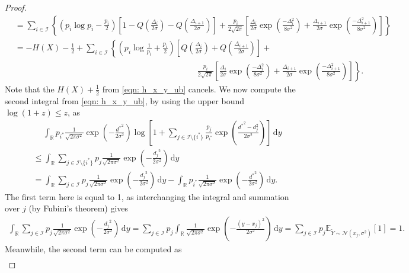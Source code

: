 \documentclass[10pt,a4paper]{amsart}
\newcommand{\bbE}{\mathbb{E}}
\newcommand{\bbR}{\mathbb{R}}
\newcommand{\calI}{\mathcal{I}}
\newcommand{\calN}{\mathcal{N}}
\newcommand{\intR}{\int_{\bbR}}
\renewcommand{\d}{\,\mathrm{d}}
\begin{document}
\begin{proof}[Proof]
\begin{align*}
			&= \sum_{i \in \calI} \left\{ \left(p_i\log p_i-\tfrac{p_i}{2}\right) \left[1-Q\left(\tfrac{\Delta_i}{2\sigma}\right)-Q\left(\tfrac{\Delta_{i+1}}{2\sigma}\right)\right] + \tfrac{p_i}{2\sqrt{2\pi}}\left[\tfrac{\Delta_i}{2\sigma}\exp\left(\tfrac{-\Delta_i^2}{8\sigma^2}\right)+\tfrac{\Delta_{i+1}}{2\sigma}\exp\left(\tfrac{-\Delta_{i+1}^2}{8\sigma^2}\right)\right] \right\} \\
			&= -H(X)-\tfrac12 + \sum_{i \in \calI} \left\{ \left(p_i\log \tfrac{1}{p_i}+\tfrac{p_i}{2}\right) \left[Q\left(\tfrac{\Delta_i}{2\sigma}\right)+Q\left(\tfrac{\Delta_{i+1}}{2\sigma}\right)\right] + \right.\\
			&\qquad \qquad \qquad \qquad \qquad \qquad  \qquad \qquad \qquad \qquad \qquad \left.\tfrac{p_i}{2\sqrt{2\pi}}\left[\tfrac{\Delta_i}{2\sigma}\exp\left(\tfrac{-\Delta_i^2}{8\sigma^2}\right)+\tfrac{\Delta_{i+1}}{2\sigma}\exp\left(\tfrac{-\Delta_{i+1}^2}{8\sigma^2}\right)\right] \right\}.
		\end{align*}
		Note that the $H(X) + \frac12$ from \eqref{eqn: h_x_y_ub} cancels. We now compute the second integral from \eqref{eqn: h_x_y_ub}, by using the upper bound $\log(1+z) \leq z$, as
		\begin{align*}
			& \quad \ \intR p_{i^*} \tfrac{1}{\sqrt{2\pi \sigma^2}}\exp\left(-\tfrac{{d^*}^2}{2\sigma^2}\right) \log \left[1 + \sum_{j \in \calI \setminus \{i^*\}} \frac{p_j}{p_{i^*}} \exp\left(\tfrac{{d^*}^2-d_j^2}{2\sigma^2}\right)\right] \d y\\
			&\leq \intR \sum_{j \in \calI \setminus \{i^*\}} p_j \tfrac{1}{\sqrt{2\pi \sigma^2}}\exp\left(-\tfrac{{d_j}^2}{2\sigma^2}\right) \d y\\
			&= \intR \sum_{j \in \calI} p_j \tfrac{1}{\sqrt{2\pi \sigma^2}}\exp\left(-\tfrac{{d_j}^2}{2\sigma^2}\right) \d y - \intR p_{i^*} \tfrac{1}{\sqrt{2\pi \sigma^2}}\exp\left(-\tfrac{{d^*}^2}{2\sigma^2}\right) \d y.
		\end{align*}
		The first term here is equal to 1, as interchanging the integral and summation over $j$ (by Fubini's theorem) gives 
		\begin{align*}
			\intR \sum_{j \in \calI} p_j \tfrac{1}{\sqrt{2\pi \sigma^2}}\exp\left(-\tfrac{{d_j}^2}{2\sigma^2}\right) \d y = \sum_{j \in \calI} p_j \intR \tfrac{1}{\sqrt{2\pi \sigma^2}}\exp\left(-\tfrac{{(y-x_j)}^2}{2\sigma^2}\right) \d y = \sum_{j \in \calI} p_j \bbE_{\tilde Y \sim \calN(x_j, \sigma^2)}[1] = 1.
		\end{align*}
		Meanwhile, the second term can be computed as
		\begin{align*}

\end{align*}
\end{proof}
\end{document}
